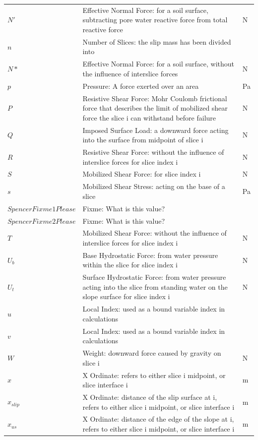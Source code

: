 \documentclass[12pt]{article}
\begin{document}
\begin{longtabu}{l X[l] l}
\\
$N'$ & Effective Normal Force: for a soil surface, subtracting pore water reactive force from total reactive force & N
\\
$n$ & Number of Slices: the slip mass has been divided into & 
\\
$N*$ & Effective Normal Force: for a soil surface, without the influence of interslice forces & N
\\
$p$ & Pressure: A force exerted over an area & Pa
\\
$P$ & Resistive Shear Force: Mohr Coulomb frictional force that describes the limit of mobilized shear force the slice i can withstand before failure & N
\\
$Q$ & Imposed Surface Load: a downward force acting into the surface from midpoint of slice i & N
\\
$R$ & Resistive Shear Force: without the influence of interslice forces for slice index i & N
\\
$S$ & Mobilized Shear Force: for slice index i & N
\\
$s$ & Mobilized Shear Stress: acting on the base of a slice & Pa
\\
$SpencerFixme1Please$ & Fixme: What is this value? & 
\\
$SpencerFixme2Please$ & Fixme: What is this value? & 
\\
$T$ & Mobilized Shear Force: without the influence of interslice forces for slice index i & N
\\
${U_{b}}$ & Base Hydrostatic Force: from water pressure within the slice for slice index i & N
\\
${U_{t}}$ & Surface Hydrostatic Force: from water pressure acting into the slice from standing water on the slope surface for slice index i & N
\\
$u$ & Local Index: used as a bound variable index in calculations & 
\\
$v$ & Local Index: used as a bound variable index in calculations & 
\\
$W$ & Weight: downward force caused by gravity on slice i & N
\\
$x$ & X Ordinate: refers to either slice i midpoint, or slice interface i & m
\\
${x_{slip}}$ & X Ordinate: distance of the slip surface at i, refers to either slice i midpoint, or slice interface i & m
\\
${x_{us}}$ & X Ordinate: distance of the edge of the slope at i, refers to either slice i midpoint, or slice interface i & m

\end{longtabu}
\end{document}
